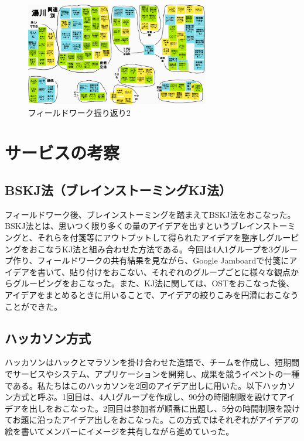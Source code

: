 \begin{figure}[htbp]
    \begin{center}
    \includegraphics[width=8cm]{images/FW2.png}
    \end{center}
    \caption{フィールドワーク振り返り2}
    \label{fig:furikaeri2}
\end{figure}


\section{サービスの考察}

\subsection{BSKJ法（ブレインストーミングKJ法）}
フィールドワーク後、ブレインストーミングを踏まえてBSKJ法をおこなった。BSKJ法とは、思いつく限り多くの量のアイデアを出すというブレインストーミングと、それらを付箋等にアウトプットして得られたアイデアを整序しグルーピングをおこなうKJ法と組み合わせた方法である。今回は4人1グループを3グループ作り、フィールドワークの共有結果を見ながら、Google Jamboardで付箋にアイデアを書いて、貼り付けをおこない、それぞれのグループごとに様々な観点からグルーピングをおこなった。また、KJ法に関しては、OSTをおこなった後、アイデアをまとめるときに用いることで、アイデアの絞りこみを円滑におこなうことができた。

\subsection{ハッカソン方式}
ハッカソンはハックとマラソンを掛け合わせた造語で、チームを作成し、短期間でサービスやシステム、アプリケーションを開発し、成果を競うイベントの一種である。私たちはこのハッカソンを2回のアイデア出しに用いた。以下ハッカソン方式と呼ぶ。1回目は、4人1グループを作成し、90分の時間制限を設けてアイデアを出しをおこなった。2回目は参加者が順番に出題し、5分の時間制限を設けてお題に沿ったアイデア出しをおこなった。この方式ではそれぞれがアイデアの絵を書いてメンバーにイメージを共有しながら進めていった。

